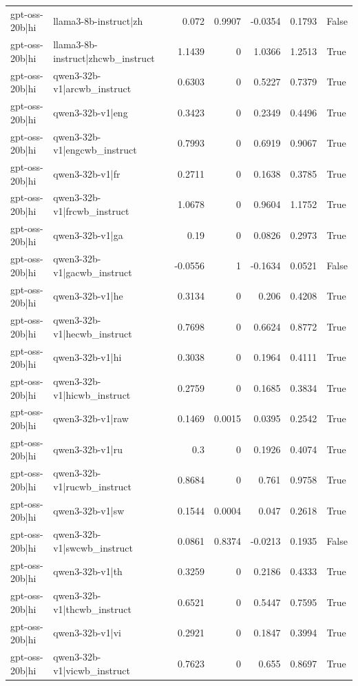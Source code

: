 \begin{table}
\begin{tabular}{l l r r r r l}
gpt-oss-20b|hi & llama3-8b-instruct|zh & 0.072 & 0.9907 & -0.0354 & 0.1793 & False \\
gpt-oss-20b|hi & llama3-8b-instruct|zhcwb_instruct & 1.1439 & 0 & 1.0366 & 1.2513 & True \\
gpt-oss-20b|hi & qwen3-32b-v1|arcwb_instruct & 0.6303 & 0 & 0.5227 & 0.7379 & True \\
gpt-oss-20b|hi & qwen3-32b-v1|eng & 0.3423 & 0 & 0.2349 & 0.4496 & True \\
gpt-oss-20b|hi & qwen3-32b-v1|engcwb_instruct & 0.7993 & 0 & 0.6919 & 0.9067 & True \\
gpt-oss-20b|hi & qwen3-32b-v1|fr & 0.2711 & 0 & 0.1638 & 0.3785 & True \\
gpt-oss-20b|hi & qwen3-32b-v1|frcwb_instruct & 1.0678 & 0 & 0.9604 & 1.1752 & True \\
gpt-oss-20b|hi & qwen3-32b-v1|ga & 0.19 & 0 & 0.0826 & 0.2973 & True \\
gpt-oss-20b|hi & qwen3-32b-v1|gacwb_instruct & -0.0556 & 1 & -0.1634 & 0.0521 & False \\
gpt-oss-20b|hi & qwen3-32b-v1|he & 0.3134 & 0 & 0.206 & 0.4208 & True \\
gpt-oss-20b|hi & qwen3-32b-v1|hecwb_instruct & 0.7698 & 0 & 0.6624 & 0.8772 & True \\
gpt-oss-20b|hi & qwen3-32b-v1|hi & 0.3038 & 0 & 0.1964 & 0.4111 & True \\
gpt-oss-20b|hi & qwen3-32b-v1|hicwb_instruct & 0.2759 & 0 & 0.1685 & 0.3834 & True \\
gpt-oss-20b|hi & qwen3-32b-v1|raw & 0.1469 & 0.0015 & 0.0395 & 0.2542 & True \\
gpt-oss-20b|hi & qwen3-32b-v1|ru & 0.3 & 0 & 0.1926 & 0.4074 & True \\
gpt-oss-20b|hi & qwen3-32b-v1|rucwb_instruct & 0.8684 & 0 & 0.761 & 0.9758 & True \\
gpt-oss-20b|hi & qwen3-32b-v1|sw & 0.1544 & 0.0004 & 0.047 & 0.2618 & True \\
gpt-oss-20b|hi & qwen3-32b-v1|swcwb_instruct & 0.0861 & 0.8374 & -0.0213 & 0.1935 & False \\
gpt-oss-20b|hi & qwen3-32b-v1|th & 0.3259 & 0 & 0.2186 & 0.4333 & True \\
gpt-oss-20b|hi & qwen3-32b-v1|thcwb_instruct & 0.6521 & 0 & 0.5447 & 0.7595 & True \\
gpt-oss-20b|hi & qwen3-32b-v1|vi & 0.2921 & 0 & 0.1847 & 0.3994 & True \\
gpt-oss-20b|hi & qwen3-32b-v1|vicwb_instruct & 0.7623 & 0 & 0.655 & 0.8697 & True \\

\end{tabular}
\end{table}
